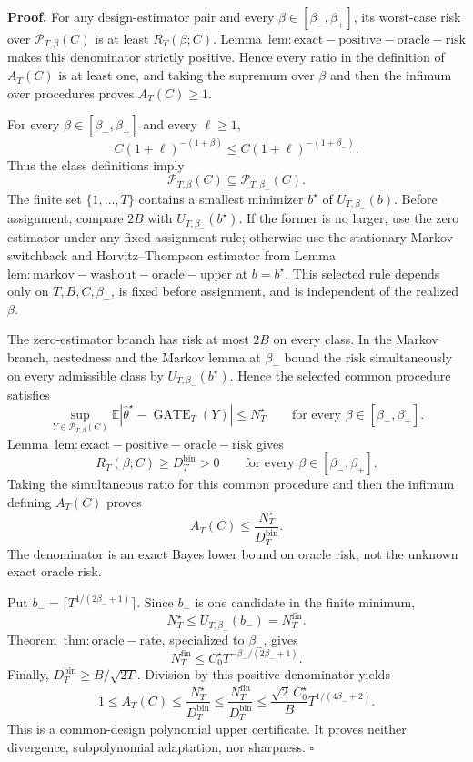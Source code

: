 \textbf{Proof.} For any design-estimator pair and every \(\beta\in[\beta_-,\beta_+]\), its worst-case risk over \(\mathcal P_{T,\beta}(C)\) is at least \(R_T(\beta;C)\). Lemma~\(\mathrm{lem:exact-positive-oracle-risk}\) makes this denominator strictly positive. Hence every ratio in the definition of \(A_T(C)\) is at least one, and taking the supremum over \(\beta\) and then the infimum over procedures proves \(A_T(C)\ge1\).

For every \(\beta\in[\beta_-,\beta_+]\) and every \(\ell\ge1\),
\[
C(1+\ell)^{-(1+\beta)}\le C(1+\ell)^{-(1+\beta_-)}.
\]
Thus the class definitions imply
\[
\mathcal P_{T,\beta}(C)\subseteq\mathcal P_{T,\beta_-}(C).
\]
The finite set \(\{1,\ldots,T\}\) contains a smallest minimizer \(b^\star\) of \(U_{T,\beta_-}(b)\). Before assignment, compare \(2B\) with \(U_{T,\beta_-}(b^\star)\). If the former is no larger, use the zero estimator under any fixed assignment rule; otherwise use the stationary Markov switchback and Horvitz--Thompson estimator from Lemma~\(\mathrm{lem:markov-washout-oracle-upper}\) at \(b=b^\star\). This selected rule depends only on \(T,B,C,\beta_-\), is fixed before assignment, and is independent of the realized \(\beta\).

The zero-estimator branch has risk at most \(2B\) on every class. In the Markov branch, nestedness and the Markov lemma at \(\beta_-\) bound the risk simultaneously on every admissible class by \(U_{T,\beta_-}(b^\star)\). Hence the selected common procedure satisfies
\[
\sup_{Y\in\mathcal P_{T,\beta}(C)}
\mathbb E\left|\widehat\theta^\star-\operatorname{GATE}_T(Y)\right|
\le N_T^\star
\qquad\text{for every }\beta\in[\beta_-,\beta_+].
\]
Lemma~\(\mathrm{lem:exact-positive-oracle-risk}\) gives
\[
R_T(\beta;C)\ge D_T^{\mathrm{bin}}>0
\qquad\text{for every }\beta\in[\beta_-,\beta_+].
\]
Taking the simultaneous ratio for this common procedure and then the infimum defining \(A_T(C)\) proves
\[
A_T(C)\le\frac{N_T^\star}{D_T^{\mathrm{bin}}}.
\]
The denominator is an exact Bayes lower bound on oracle risk, not the unknown exact oracle risk.

Put \(b_-=\lceil T^{1/(2\beta_-+1)}\rceil\). Since \(b_-\) is one candidate in the finite minimum,
\[
N_T^\star\le U_{T,\beta_-}(b_-)=N_T^{\mathrm{fin}}.
\]
Theorem~\(\mathrm{thm:oracle-rate}\), specialized to \(\beta_-\), gives
\[
N_T^{\mathrm{fin}}\le C_0^\star T^{-\beta_-/(2\beta_-+1)}.
\]
Finally, \(D_T^{\mathrm{bin}}\ge B/\sqrt{2T}\). Division by this positive denominator yields
\[
1\le A_T(C)
\le\frac{N_T^\star}{D_T^{\mathrm{bin}}}
\le\frac{N_T^{\mathrm{fin}}}{D_T^{\mathrm{bin}}}
\le\frac{\sqrt2\,C_0^\star}{B}T^{1/(4\beta_-+2)}.
\]
This is a common-design polynomial upper certificate. It proves neither divergence, subpolynomial adaptation, nor sharpness. \(\square\)